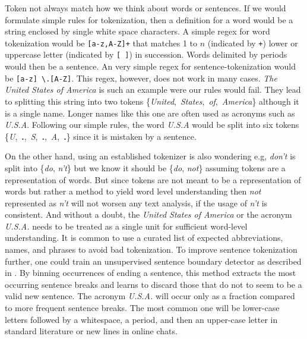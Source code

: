 Token not always match how we think about words or sentences.
If we would formulate simple rules for tokenization, then a definition for a word would be a string enclosed by single white space characters.
A simple regex for word tokenization would be \texttt{[a-z,A-Z]+} that matches 1 to $n$ (indicated by \texttt{+}) lower or uppercase letter (indicated by \texttt{[ ]}) in succession.
Words delimited by periods would then be a sentence.
An very simple regex for sentence-tokenization would be \texttt{[a-z] \textbackslash.[A-Z]}.
This regex, however, does not work in many cases.
\textit{The United States of America} is such an example were our rules would fail. They lead to splitting this string into two tokens \mbox{\{\textquotesingle \textit{United}\textquotesingle, \textquotesingle \textit{States}\textquotesingle, \textquotesingle \textit{of}\textquotesingle, \textquotesingle \textit{America}\textquotesingle\}} although it is a single name.
Longer names like this one are often used as acronyms such as \textit{U.S.A}.
Following our simple rules, the word \textit{U.S.A} would be split into six tokens \mbox{\{\textquotesingle \textit{U}\textquotesingle, \textquotesingle \textbf{.}\textquotesingle, \textquotesingle \textit{S}\textquotesingle, \textquotesingle \textbf{.}\textquotesingle, \textquotesingle \textit{A}\textquotesingle, \textquotesingle \textbf{.}\textquotesingle\}} since it is mistaken by a sentence.

On the other hand, using an established tokenizer is also wondering e.g, \textit{don't} is split into \{\textit{do}, \textit{n't}\} but we know it should be \{\textit{do}, \textit{not}\} assuming tokens are a representation of words.
But since tokens are not meant to be a representation of words but rather a method to yield word level understanding then \textit{not} represented as \textit{n't} will not worsen any text analysis, if the usage of \textit{n't} is consistent.
And without a doubt, the \textit{United States of America} or the acronym \textit{U.S.A.} needs to be treated as a single unit for sufficient word-level understanding.
It is common to use a curated list of expected abbreviations, names, and phrases to avoid bad tokenization.
To improve sentence tokenization further, one could train an unsupervised sentence boundary detector as described in \cite{Kiss2006}.
By binning occurrences of ending a sentence, this method extracts the most occurring sentence breaks and learns to discard those that do not to seem to be a valid new sentence.
The acronym \textit{U.S.A.} will occur only as a fraction compared to more frequent sentence breaks.
The most common one will be lower-case letters followed by a whitespace, a period, and then an upper-case letter in standard literature or new lines in online chats.

